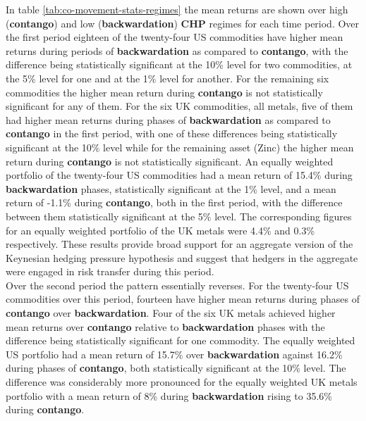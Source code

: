 \documentclass[]{elsarticle} %
\begin{document}
In table \ref{tab:co-movement-stats-regimes} the mean returns are shown over high (\textbf{contango}) and low (\textbf{backwardation}) \textbf{CHP} regimes for each time period. Over the first period eighteen of the twenty-four US commodities have higher mean returns during periods of \textbf{backwardation} as compared to \textbf{contango}, with the difference being statistically significant at the 10\% level for two commodities, at the 5\% level for one and at the 1\% level for another. For the remaining six commodities the higher mean return during \textbf{contango} is not statistically significant for any of them. For the six UK commodities, all metals, five of them had higher mean returns during phases of \textbf{backwardation} as compared to \textbf{contango} in the first period, with one of these differences being statistically significant at the 10\% level while for the remaining asset (Zinc) the higher mean return during \textbf{contango} is not statistically significant. An equally weighted portfolio of the twenty-four US commodities had a mean return of 15.4\% during \textbf{backwardation} phases, statistically significant at the 1\% level, and a mean return of -1.1\% during \textbf{contango}, both in the first period, with the difference between them statistically significant at the 5\% level. The corresponding figures for an equally weighted portfolio of the UK metals were 4.4\% and 0.3\% respectively. These results provide broad support for an aggregate version of the Keynesian hedging pressure hypothesis and suggest that hedgers in the aggregate were engaged in risk transfer during this period.\\
Over the second period the pattern essentially reverses. For the twenty-four US commodities over this period, fourteen have higher mean returns during phases of \textbf{contango} over \textbf{backwardation}. Four of the six UK metals achieved higher mean returns over \textbf{contango} relative to \textbf{backwardation} phases with the difference being statistically significant for one commodity. The equally weighted US portfolio had a mean return of 15.7\% over \textbf{backwardation} against 16.2\% during phases of \textbf{contango}, both statistically significant at the 10\% level. The difference was considerably more pronounced for the equally weighted UK metals portfolio with a mean return of 8\% during \textbf{backwardation} rising to 35.6\% during \textbf{contango}.\\
\end{document}
